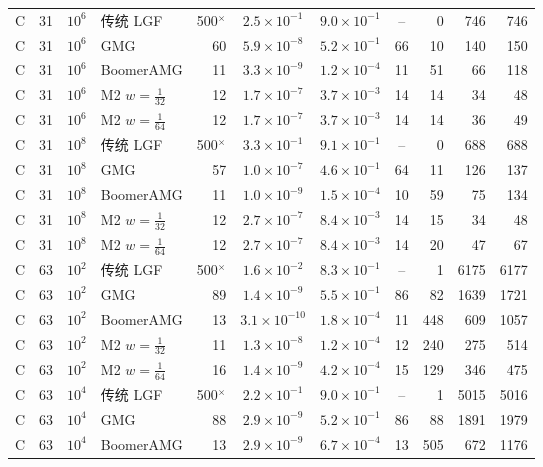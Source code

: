 \begin{longtable}{lrrlrcccrrr}
C & 31 & $10^{6}$ & 传统 LGF & 500$^\times$ & $2.5{\times}10^{-1}$ & $9.0{\times}10^{-1}$ & -- & 0 & 746 & 746 \\
C & 31 & $10^{6}$ & GMG & 60 & $5.9{\times}10^{-8}$ & $5.2{\times}10^{-1}$ & 66 & 10 & 140 & 150 \\
C & 31 & $10^{6}$ & BoomerAMG & 11 & $3.3{\times}10^{-9}$ & $1.2{\times}10^{-4}$ & 11 & 51 & 66 & 118 \\
C & 31 & $10^{6}$ & M2 $w{=}\frac1{32}$ & 12 & $1.7{\times}10^{-7}$ & $3.7{\times}10^{-3}$ & 14 & 14 & 34 & 48 \\
C & 31 & $10^{6}$ & M2 $w{=}\frac1{64}$ & 12 & $1.7{\times}10^{-7}$ & $3.7{\times}10^{-3}$ & 14 & 14 & 36 & 49 \\
C & 31 & $10^{8}$ & 传统 LGF & 500$^\times$ & $3.3{\times}10^{-1}$ & $9.1{\times}10^{-1}$ & -- & 0 & 688 & 688 \\
C & 31 & $10^{8}$ & GMG & 57 & $1.0{\times}10^{-7}$ & $4.6{\times}10^{-1}$ & 64 & 11 & 126 & 137 \\
C & 31 & $10^{8}$ & BoomerAMG & 11 & $1.0{\times}10^{-9}$ & $1.5{\times}10^{-4}$ & 10 & 59 & 75 & 134 \\
C & 31 & $10^{8}$ & M2 $w{=}\frac1{32}$ & 12 & $2.7{\times}10^{-7}$ & $8.4{\times}10^{-3}$ & 14 & 15 & 34 & 48 \\
C & 31 & $10^{8}$ & M2 $w{=}\frac1{64}$ & 12 & $2.7{\times}10^{-7}$ & $8.4{\times}10^{-3}$ & 14 & 20 & 47 & 67 \\
C & 63 & $10^{2}$ & 传统 LGF & 500$^\times$ & $1.6{\times}10^{-2}$ & $8.3{\times}10^{-1}$ & -- & 1 & 6175 & 6177 \\
C & 63 & $10^{2}$ & GMG & 89 & $1.4{\times}10^{-9}$ & $5.5{\times}10^{-1}$ & 86 & 82 & 1639 & 1721 \\
C & 63 & $10^{2}$ & BoomerAMG & 13 & $3.1{\times}10^{-10}$ & $1.8{\times}10^{-4}$ & 11 & 448 & 609 & 1057 \\
C & 63 & $10^{2}$ & M2 $w{=}\frac1{32}$ & 11 & $1.3{\times}10^{-8}$ & $1.2{\times}10^{-4}$ & 12 & 240 & 275 & 514 \\
C & 63 & $10^{2}$ & M2 $w{=}\frac1{64}$ & 16 & $1.4{\times}10^{-9}$ & $4.2{\times}10^{-4}$ & 15 & 129 & 346 & 475 \\
C & 63 & $10^{4}$ & 传统 LGF & 500$^\times$ & $2.2{\times}10^{-1}$ & $9.0{\times}10^{-1}$ & -- & 1 & 5015 & 5016 \\
C & 63 & $10^{4}$ & GMG & 88 & $2.9{\times}10^{-9}$ & $5.2{\times}10^{-1}$ & 86 & 88 & 1891 & 1979 \\
C & 63 & $10^{4}$ & BoomerAMG & 13 & $2.9{\times}10^{-9}$ & $6.7{\times}10^{-4}$ & 13 & 505 & 672 & 1176 \\

\end{longtable}
